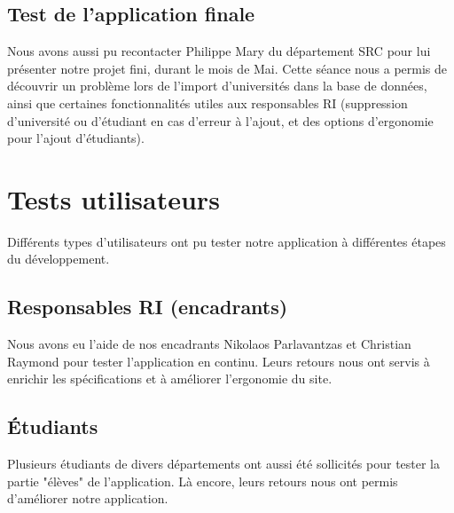 \subsection{Test de l'application finale}
Nous avons aussi pu recontacter Philippe Mary du département SRC pour lui présenter notre projet fini, durant le mois de Mai. Cette séance nous a permis de découvrir un problème lors de l'import d'universités dans la base de données, ainsi que certaines fonctionnalités utiles aux responsables RI (suppression d'université ou d'étudiant en cas d'erreur à l'ajout, et des options d'ergonomie pour l'ajout d'étudiants). 

\section{Tests utilisateurs}
Différents types d'utilisateurs ont pu tester notre application à différentes étapes du développement.
\subsection{Responsables RI (encadrants)}
Nous avons eu l'aide de nos encadrants Nikolaos Parlavantzas et Christian Raymond pour tester l'application en continu. Leurs retours nous ont servis à enrichir les spécifications et à améliorer l'ergonomie du site.
\subsection{Étudiants}
Plusieurs étudiants de divers départements ont aussi été sollicités pour tester la partie "élèves" de l'application. Là encore, leurs retours nous ont permis d'améliorer notre application.